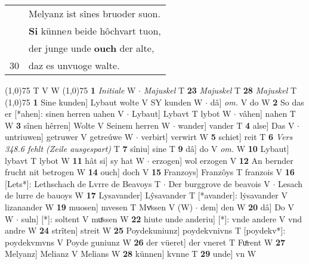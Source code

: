 \documentclass[8pt,a4paper,notitlepage]{article}
\begin{document}
\begin{table}[ht]
\begin{minipage}[t]{0.5\linewidth}
\begin{tabular}{rl}
 & Melyanz ist sînes bruoder suon.\\ 
 & \textbf{Si} künne\textit{n} beide hôchvart tuon,\\ 
 & der junge unde \textbf{ouch} der alte,\\ 
30 & daz es unvuoge walte.\\ 
\end{tabular}
\scriptsize
\line(1,0){75} \newline
T V W \newline
\line(1,0){75} \newline
\textbf{1} \textit{Initiale} W   $\cdot$ \textit{Majuskel} T  \textbf{23} \textit{Majuskel} T  \textbf{28} \textit{Majuskel} T  \newline
\line(1,0){75} \newline
\textbf{1} Sine kunden] Lybaut wolte V SY kunden W  $\cdot$ dâ] \textit{om.} V do W \textbf{2} So das er [*ahen]: sinen herren uahen V  $\cdot$ Lybaut] Lybavt T lybot W  $\cdot$ vâhen] nahen T W \textbf{3} sînen hêrren] Wolte V Seinem herren W  $\cdot$ wander] vander T \textbf{4} alse] Das V  $\cdot$ untriuwen] getruwer V getreúwe W  $\cdot$ verbirt] verwirt W \textbf{5} schiet] reit T \textbf{6} \textit{Vers 348.6 fehlt (Zeile ausgespart)} T  \textbf{7} sîniu] sine T \textbf{9} dâ] do V \textit{om.} W \textbf{10} Lybaut] lybavt T lybot W \textbf{11} hât si] sy hat W  $\cdot$ erzogen] wol erzogen V \textbf{12} An bernder frucht nit betrogen W \textbf{14} ouch] doch V \textbf{15} Franzoys] Franzôys T franzois V \textbf{16} [Lets*]: Lethschach de Lvrre de Beavoys T  $\cdot$ Der burggrove de beavois V  $\cdot$ Lesach de lurre de bauoys W \textbf{17} Lysavander] Lŷsavander T [*avander]: lẏsavander V lizanander W \textbf{19} muosen] mvesen T Mvͤssen V (W)  $\cdot$ dem] den W \textbf{20} dâ] Do V W  $\cdot$ suln] [*]: soltent V muͤssen W \textbf{22} hiute unde anderiu] [*]: vnde andere V vnd andre W \textbf{24} strîten] streit W \textbf{25} Poydekuniunz] poydekvnivns T [poydekv*]: poydekvmvns V Poyde guniunz W \textbf{26} der vüeret] der vneret T Fuͤrent W \textbf{27} Melyanz] Melianz V Melians W \textbf{28} künnen] kvnne T \textbf{29} unde] vn W \newline
\end{minipage}
\end{table}
\end{document}
